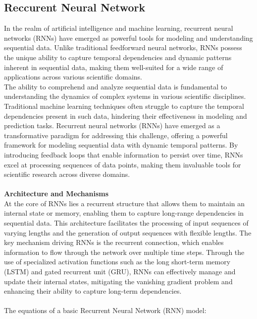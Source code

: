 \documentclass[12pt]{article}
\begin{document}
    \subsection{Reccurent Neural Network}
    In the realm of artificial intelligence and machine learning, recurrent neural networks (RNNs)
    have emerged as powerful tools for modeling and understanding sequential data.
    Unlike traditional feedforward neural networks, RNNs possess the unique ability to capture
    temporal dependencies and dynamic patterns inherent in sequential data, making
    them well-suited for a wide range of applications across various scientific domains.\\
    The ability to comprehend and analyze sequential data is fundamental to understanding the
    dynamics of complex systems in various scientific disciplines. Traditional machine learning
    techniques often struggle to capture the temporal dependencies present in such data,
    hindering their effectiveness in modeling and prediction tasks. Recurrent neural
    networks (RNNs) have emerged as a transformative paradigm for addressing this challenge,
    offering a powerful framework for modeling sequential data with dynamic temporal patterns.
    By introducing feedback loops that enable information to persist over time, RNNs excel
    at processing sequences of data points, making them invaluable tools for scientific research
    across diverse domains.\\
    \\
    \textbf{Architecture and Mechanisms}\\
    At the core of RNNs lies a recurrent structure that allows them to maintain an internal
    state or memory, enabling them to capture long-range dependencies in sequential data. This
    architecture facilitates the processing of input sequences of varying lengths and
    the generation of output sequences with flexible lengths. The key mechanism driving
    RNNs is the recurrent connection, which enables information to flow through the network
    over multiple time steps. Through the use of specialized activation functions such as
    the long short-term memory (LSTM) and gated recurrent unit (GRU), RNNs can effectively
    manage and update their internal states, mitigating the vanishing gradient problem and
    enhancing their ability to capture long-term dependencies.\\
    \\
    The equations of a basic Recurrent Neural Network (RNN) model:\\
\end{document}
